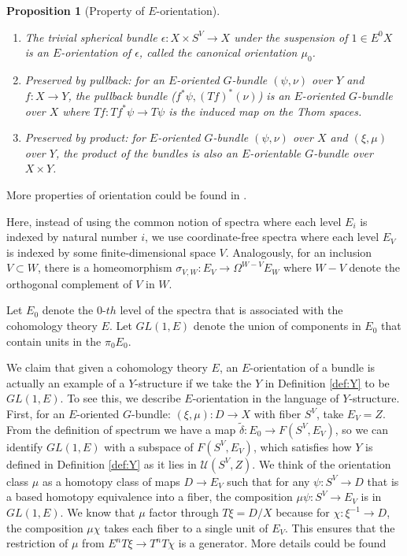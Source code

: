 \documentclass[psamsfonts]{amsart}
\newtheorem{prop}[thm]{Proposition}
\theoremstyle{definition}
\theoremstyle{remark}
\numberwithin{equation}{section}
\begin{document}

\begin{prop}[Property of $E$-orientation]
\leavevmode
\begin{enumerate}
	\item The trivial spherical bundle $\epsilon: X \times S^{V} \to X$ under the suspension of $1 \in E^{0}X$ is an $E$-orientation of $\epsilon$, called the canonical orientation $\mu_{0}$.
	\item Preserved by pullback: for an $E$-oriented $G$-bundle $(\psi, \nu)$ over $Y$ and $f: X \to Y$, the pullback bundle ($f^{*}\psi, (Tf)^{*}(\nu)$) is an $E$-oriented $G$-bundle over $X$ where $Tf: Tf^{*}\psi \to T\psi$ is the induced map on the Thom spaces.
	\item Preserved by product: for $E$-oriented $G$-bundle $(\psi, \nu)$ over $X$ and $(\xi, \mu)$ over $Y$, the product of the bundles is also an $E$-orientable $G$-bundle over $X \times Y$.
\end{enumerate}
\end{prop}

More properties of orientation could be found in \cite[III, Remark 1.5]{Orientation}.

Here, instead of using the common notion of spectra where each level $E_{i}$ is indexed by natural number $i$, we use coordinate-free spectra where each level $E_{V}$ is indexed by some finite-dimensional space $V$. Analogously, for an inclusion $V \subset W$, there is a homeomorphism $\sigma_{V, W}: E_{V} \to \Omega^{W - V}E_{W}$ where $W - V$ denote the orthogonal complement of $V$ in $W$.

	Let $E_{0}$ denote the 0-$th$ level of the spectra that is associated with the cohomology theory $E$.
	Let $GL(1, E)$ denote the union of components in $E_{0}$ that contain units in the $\pi_{0}E_{0}$.
	
	We claim that given a cohomology theory $E$, an $E$-orientation of a bundle is actually an example of a $Y$-structure if we take the $Y$ in Definition \ref{def:Y} to be $GL(1, E)$. To see this, we describe $E$-orientation in the language of $Y$-structure. First, for an $E$-oriented $G$-bundle: $(\xi, \mu): D \to X$ with fiber $S^{V}$, take $E_{V} = Z$. From the definition of spectrum we have a map $\tilde{\delta}: E_{0} \to F(S^{V}, E_{V})$, so we can identify $GL(1, E)$ with a subspace of $F(S^{V}, E_{V})$, which satisfies how $Y$ is defined in Definition \ref{def:Y} as it lies in $\mathcal{U}(S^{V}, Z).$
	 We think of the orientation class $\mu$ as a homotopy class of maps $D \to E_{V}$ such that for any $\psi: S^{V} \to D$ that is a based homotopy equivalence into a fiber, the composition $\mu\psi: S^{V} \to E_{V}$ is in $GL(1, E)$. 
We know that $\mu$ factor through $T\xi = D/X$ because for $\chi: \xi^{-1} \to D$, the composition $\mu\chi$ takes each fiber to a single unit of $E_V$.
This ensures that the restriction of $\mu$ from $E^{n}T\xi \to T^{n}T\chi$ is a generator. More details could be found \cite[Page 56]{Orientation}
\end{document}
